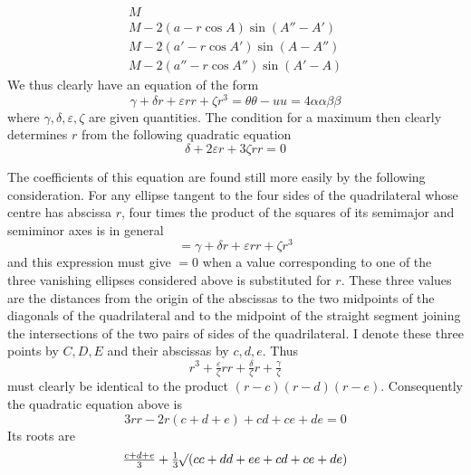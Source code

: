 %
\[
\begin{array}{l}
M\\
M-2(a-r\cos A)\sin(A''-A')\\
M-2(a'-r\cos A')\sin(A-A'')\\
M-2(a''-r\cos A'')\sin(A'-A)
\end{array}
\]
We thus clearly have an equation of the form
\[
\gamma+\delta r+\varepsilon rr+\zeta r^3=\theta\theta-uu=4\alpha\alpha\beta\beta
\]
where \(\gamma,\delta,\varepsilon,\zeta\) are given quantities. The condition for a maximum then clearly determines \(r\) from the following quadratic equation
\[
\delta+2\varepsilon r+3\zeta rr=0
\]
\par
The coefficients of this equation are found still more easily by the following consideration. For any ellipse tangent to the four sides of the quadrilateral whose centre has abscissa \(r\), four times the product of the squares of its semimajor and semiminor axes is in general
\[
=\gamma+\delta r+\varepsilon rr+\zeta r^3
\]
and this expression must give \(=0\) when a value corresponding to one of the three vanishing ellipses considered above is substituted for \(r\). These three values are the distances from the origin of the abscissas to the two midpoints of the diagonals of the quadrilateral and to the midpoint of the straight segment joining the intersections of the two pairs of sides of the quadrilateral. I denote these three points by \(C,D,E\) and their abscissas by \(c,d,e\). Thus
\[
r^3+\tfrac{\varepsilon}{\zeta}rr+\tfrac{\delta}{\zeta}r+\tfrac{\gamma}{\zeta}
\]
must clearly be identical to the product \((r-c)(r-d)(r-e)\). Consequently the quadratic equation above is
\[
3rr-2r(c+d+e)+cd+ce+de=0
\]
Its roots are
\[
\tfrac{c+d+e}{3}+\tfrac13\mathord{{}^{}\!\surd}(cc+dd+ee+cd+ce+de)
\]
